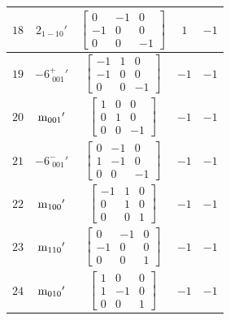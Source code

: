 \documentclass[fleqn,8pt]{jsarticle}
\begin{document}
\begin{longtable}{ccccc}
$ 18 $ & $ 2{}_{1-10}{}' $ & $ \begin{bmatrix} 0 & -1 & 0 \\ -1 & 0 & 0 \\ 0 & 0 & -1 \end{bmatrix} $ & $ 1 $ & $ -1 $ \\ \hline
$ 19 $ & $ -6^{+}_{\,\,001}{}' $ & $ \begin{bmatrix} -1 & 1 & 0 \\ -1 & 0 & 0 \\ 0 & 0 & -1 \end{bmatrix} $ & $ -1 $ & $ -1 $ \\ \hline
$ 20 $ & $ {\rm m}_{001}{}' $ & $ \begin{bmatrix} 1 & 0 & 0 \\ 0 & 1 & 0 \\ 0 & 0 & -1 \end{bmatrix} $ & $ -1 $ & $ -1 $ \\ \hline
$ 21 $ & $ -6^{-}_{\,\,001}{}' $ & $ \begin{bmatrix} 0 & -1 & 0 \\ 1 & -1 & 0 \\ 0 & 0 & -1 \end{bmatrix} $ & $ -1 $ & $ -1 $ \\ \hline
$ 22 $ & $ {\rm m}_{100}{}' $ & $ \begin{bmatrix} -1 & 1 & 0 \\ 0 & 1 & 0 \\ 0 & 0 & 1 \end{bmatrix} $ & $ -1 $ & $ -1 $ \\ \hline
$ 23 $ & $ {\rm m}_{110}{}' $ & $ \begin{bmatrix} 0 & -1 & 0 \\ -1 & 0 & 0 \\ 0 & 0 & 1 \end{bmatrix} $ & $ -1 $ & $ -1 $ \\ \hline
$ 24 $ & $ {\rm m}_{010}{}' $ & $ \begin{bmatrix} 1 & 0 & 0 \\ 1 & -1 & 0 \\ 0 & 0 & 1 \end{bmatrix} $ & $ -1 $ & $ -1 $ \\
\end{longtable}
\end{document}
